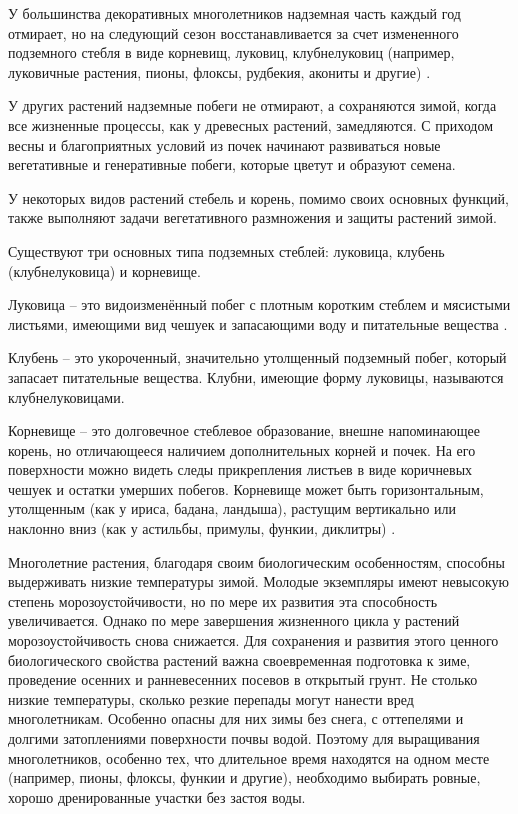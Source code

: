 У большинства декоративных многолетников надземная часть каждый год отмирает, но на следующий сезон восстанавливается за счет измененного подземного стебля в виде корневищ, луковиц, клубнелуковиц (например, луковичные растения, пионы, флоксы, рудбекия, акониты и другие) \cite{viyginaOpen}.

У других растений надземные побеги не отмирают, а сохраняются зимой, когда все жизненные процессы, как у древесных растений, замедляются. С приходом весны и благоприятных условий из почек начинают развиваться новые вегетативные и генеративные побеги, которые цветут и образуют семена.

У некоторых видов растений стебель и корень, помимо своих основных функций, также выполняют задачи вегетативного размножения и защиты растений зимой.

Существуют три основных типа подземных стеблей: луковица, клубень (клубнелуковица) и корневище.

Луковица – это видоизменённый побег с плотным коротким стеблем и мясистыми листьями, имеющими вид чешуек и запасающими воду и питательные вещества \cite{belyaevskaya}.

Клубень -- это укороченный, значительно утолщенный подземный побег, который запасает питательные вещества. Клубни, имеющие форму луковицы, называются клубнелуковицами.

Корневище -- это долговечное стеблевое образование, внешне напоминающее корень, но отличающееся наличием дополнительных корней и почек. На его поверхности можно видеть следы прикрепления листьев в виде коричневых чешуек и остатки умерших побегов. Корневище может быть горизонтальным, утолщенным (как у ириса, бадана, ландыша), растущим вертикально или наклонно вниз (как у астильбы, примулы, функии, диклитры) \cite{aldohina}.

Многолетние растения, благодаря своим биологическим особенностям, способны выдерживать низкие температуры зимой. Молодые экземпляры имеют невысокую степень морозоустойчивости, но по мере их развития эта способность увеличивается. Однако по мере завершения жизненного цикла у растений морозоустойчивость снова снижается. Для сохранения и развития этого ценного биологического свойства растений важна своевременная подготовка к зиме, проведение осенних и ранневесенних посевов в открытый грунт. Не столько низкие температуры, сколько резкие перепады могут нанести вред многолетникам. Особенно опасны для них зимы без снега, с оттепелями и долгими затоплениями поверхности почвы водой. Поэтому для выращивания многолетников, особенно тех, что длительное время находятся на одном месте (например, пионы, флоксы, функии и другие), необходимо выбирать ровные, хорошо дренированные участки без застоя воды.

